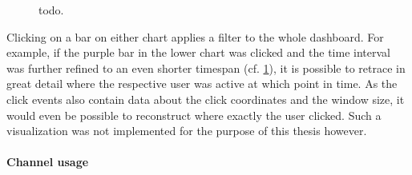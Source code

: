 \begin{figure}[h]
        \caption{todo.}
        \label{figure:evaluation:user:dashboard-clicks-zoom-user}
\end{figure}

Clicking on a bar on either chart applies a filter to the whole dashboard.
For example, if the purple bar in the lower chart was clicked and the time interval was further refined to an even shorter timespan (cf. \cref{figure:evaluation:user:dashboard-clicks-zoom-user}), it is possible to retrace in great detail where the respective user was active at which point in time.
As the click events also contain data about the click coordinates and the window size, it would even be possible to reconstruct where exactly the user clicked.
Such a visualization was not implemented for the purpose of this thesis however.

\paragraph{Channel usage}

